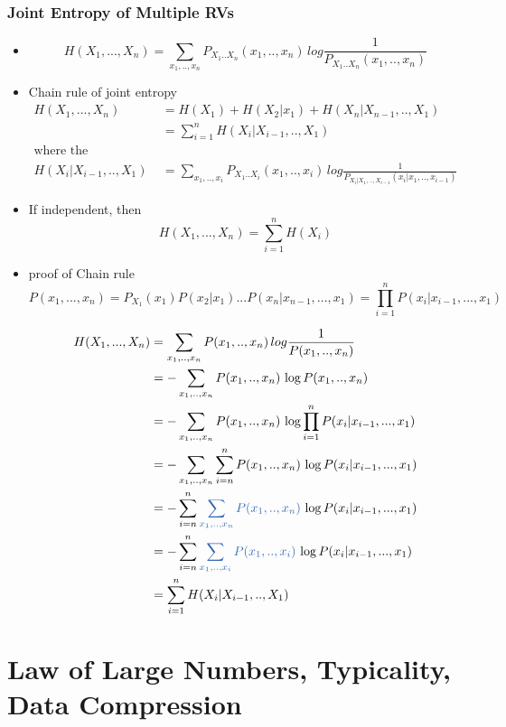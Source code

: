 \documentclass[12pt]{article}
\begin{document}
\subsubsection{Joint Entropy of Multiple RVs}
\begin{itemize}
\item 
$$ H(X_1,...,X_n) = \sum_{x_1,..,x_n}P_{X_1..X_n}(x_1,..,x_n)\,log\frac{1}{P_{X_1..X_n}(x_1,..,x_n)}$$
\item Chain rule of joint entropy
\begin{align*}
H(X_1,...,X_n) &= H(X_1) + H(X_2|x_1) + H(X_n|X_{n-1},..,X_1) \\
&=\sum_{i=1}^n H(X_i|X_{i-1},..,X_1) \\
\textrm{where the conditional entropy } \\
H(X_i|X_{i-1},..,X_1)&=\sum_{x_1,..,x_i}P_{X_1..X_i}(x_1,..,x_i)\,log\frac{1}{P_{X_i|X_1,..,X_{i-1}}(x_i|x_1,..,x_{i-1})}
\end{align*}
\item If independent, then
$$H(X_1,...,X_n) = \sum_{i=1}^n H(X_i) $$ 

\item proof of Chain rule
$$ P(x_1,...,x_n) =  P_{X_1}(x_1)P(x_2|x_1)...P(x_n|x_{n-1},...,x_1) = \prod_{i=1}^nP(x_i|x_{i-1},...,x_1) $$

\begin{align*}
H(X_1,...,X_n) &= \sum_{x_1,..,x_n}P(x_1,..,x_n)\,log\frac{1}{P(x_1,..,x_n)}\\
&= - \sum_{x_1,..,x_n}P(x_1,..,x_n)\,\log P(x_1,..,x_n)\\
&= - \sum_{x_1,..,x_n}P(x_1,..,x_n)\,\log\prod_{i=1}^n P(x_i|x_{i-1},...,x_1)\\
&= - \sum_{x_1,..,x_n}\sum_{i=n}^n P(x_1,..,x_n)\,\log P(x_i|x_{i-1},...,x_1)\\
&= - \sum_{i=n}^n\textcolor{blue1}{\sum_{x_1,..,x_n}P(x_1,..,x_n)}\,\log P (x_i|x_{i-1},...,x_1) \\
&= - \sum_{i=n}^n\textcolor{blue1}{\sum_{x_1,..,x_i}P(x_1,..,x_i)}\,\log P(x_i|x_{i-1},...,x_1) \\
&= \sum_{i=1}^n H(X_i|X_{i-1},..,X_1)
\end{align*}

\end{itemize}

\newpage

\section{Law of Large Numbers, Typicality, Data Compression}
\end{document}
